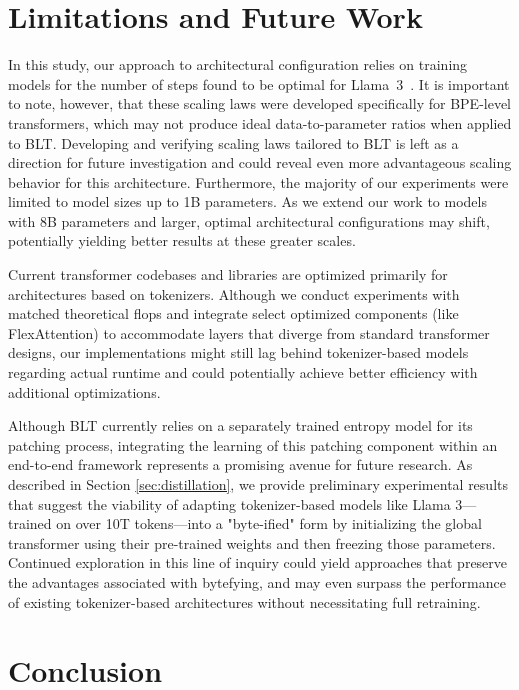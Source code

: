 \section{Limitations and Future Work}

In this study, our approach to architectural configuration relies on training models for the number of steps found to be optimal for Llama~3~\citep{dubey2024llama}. It is important to note, however, that these scaling laws were developed specifically for BPE-level transformers, which may not produce ideal data-to-parameter ratios when applied to {\textsc BLT}. Developing and verifying scaling laws tailored to {\textsc BLT} is left as a direction for future investigation and could reveal even more advantageous scaling behavior for this architecture. Furthermore, the majority of our experiments were limited to model sizes up to 1B parameters. As we extend our work to models with 8B parameters and larger, optimal architectural configurations may shift, potentially yielding better results at these greater scales.

Current transformer codebases and libraries are optimized primarily for architectures based on tokenizers. Although we conduct experiments with matched theoretical flops and integrate select optimized components (like FlexAttention) to accommodate layers that diverge from standard transformer designs, our implementations might still lag behind tokenizer-based models regarding actual runtime and could potentially achieve better efficiency with additional optimizations.

Although {\textsc BLT} currently relies on a separately trained entropy model for its patching process, integrating the learning of this patching component within an end-to-end framework represents a promising avenue for future research. As described in Section \ref{sec:distillation}, we provide preliminary experimental results that suggest the viability of adapting tokenizer-based models like Llama 3—trained on over 10T tokens—into a "byte-ified" form by initializing the global transformer using their pre-trained weights and then freezing those parameters. Continued exploration in this line of inquiry could yield approaches that preserve the advantages associated with bytefying, and may even surpass the performance of existing tokenizer-based architectures without necessitating full retraining.

\section{Conclusion}
\label{section:conclusion}

